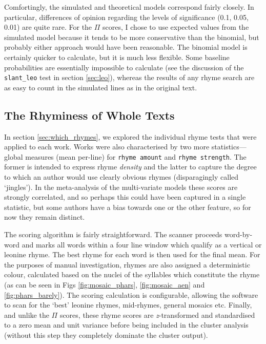 \documentclass[twocolumn, switch, a4paper]{article} %
\begin{document}
Comfortingly, the simulated and theoretical models correspond fairly closely.
In particular, differences of opinion regarding the levels of significance
(0.1, 0.05, 0.01) are quite rare. For the $\Pi$ scores, I chose to use
expected values from the simulated model because it tends to be more
conservative than the binomial, but probably either approach would have been
reasonable. The binomial model is certainly quicker to calculate, but it is
much less flexible. Some baseline probabilities are essentially impossible to
calculate (see the discussion of the \texttt{slant\_leo} test in section
\ref{sec:leo}), whereas the results of any rhyme search are as easy to count
in the simulated lines as in the original text.

\subsection{The Rhyminess of Whole Texts}
\label{sec:whole_rhyminess}

In section \ref{sec:which_rhymes}, we explored the individual rhyme tests that
were applied to each work. Works were also characterised by two more
statistics---global measures (mean per-line) for \texttt{rhyme amount} and
\texttt{rhyme strength}. The former is intended to express rhyme
\emph{density} and the latter to capture the degree to which an author would
use clearly obvious rhymes (disparagingly called `jingles'). In the
meta-analysis of the multi-variate models these scores are strongly
correlated, and so perhaps this could have been captured in a single
statistic, but some authors have a bias towards one or the other feature,
so for now they remain distinct.

The scoring algorithm is fairly straightforward. The scanner proceeds
word-by-word and marks all words within a four line window which qualify as a
vertical or leonine rhyme. The best rhyme for each word is then used for the
final mean. For the purposes of manual investigation, rhymes are also assigned
a deterministic colour, calculated based on the nuclei of the syllables which
constitute the rhyme (as can be seen in Figs \ref{fig:mosaic_phars},
\ref{fig:mosaic_aen} and \ref{fig:phars_barely}). The scoring calculation is
configurable, allowing the software to scan for the `best' leonine rhymes,
mid-rhymes, general mosaics etc. Finally, and unlike the $\Pi$ scores, these
rhyme scores are \emph{z}-transformed and standardised to a zero mean and unit
variance before being included in the cluster analysis (without this step they
completely dominate the cluster output).
\end{document}
